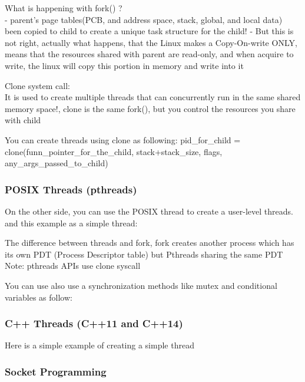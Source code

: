 \documentclass{article}
\begin{document}
What is happening with fork() ?\\
- parent's page tables(PCB, and address space, stack, global, and local data) been copied to child to create a unique task structure for the child!
- But this is not right, actually what happens, that the Linux makes a Copy-On-write ONLY, means that the resources shared with parent are read-only, and when acquire to write, the linux will copy this portion in memory and write into it



Clone system call:\\
It is used to create multiple threads that can concurrently run in the same shared memory space!, clone is the same fork(), but you control the resources you share with child

You can create threads using clone as following:
pid\_for\_child = clone(funn\_pointer\_for\_the\_child, stack+stack\_size, flags, any\_args\_passed\_to\_child)

\subsubsection{POSIX Threads (pthreads)}
On the other side, you can use the POSIX thread to create a user-level threads. and this example as a simple thread:


The difference between threads and fork, fork creates another process which has its own PDT (Process Descriptor table) but Pthreads sharing the same PDT
Note: pthreads APIs use clone syscall

You can use also use a synchronization methods like mutex and conditional variables as follow:



\subsubsection{C++ Threads (C++11 and C++14)} 
Here is a simple example of creating a simple thread


\subsubsection{Socket Programming}
\end{document}
